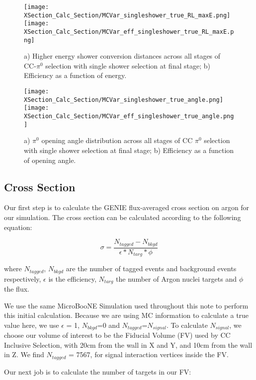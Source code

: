 \begin{figure}[h!]
\centering
\texttt{[image: XSection\_Calc\_Section/MCVar\_singleshower\_true\_RL\_maxE.png]}
\hspace{1 mm}
\texttt{[image: XSection\_Calc\_Section/MCVar\_eff\_singleshower\_true\_RL\_maxE.png]}
\caption{a) Higher energy shower conversion distances across all stages of CC-$\pi^0$ selection with single shower selection at final stage; b) Efficiency as a function of energy. }
\label{fig:pi0_effs_12}
\end{figure}


\begin{figure}[h!]
\texttt{[image: XSection\_Calc\_Section/MCVar\_singleshower\_true\_angle.png]}
\hspace{3 mm}
\texttt{[image: XSection\_Calc\_Section/MCVar\_eff\_singleshower\_true\_angle.png]}
\caption{a) $\pi^0$ opening angle distribution across all stages of CC $\pi^0$ selection with single shower selection at final stage; b) Efficiency as a function of opening angle. }
\label{fig:pi0_effs_13}
\end{figure}

\clearpage
\subsection{Cross Section}

Our first step is to calculate the GENIE flux-averaged cross section on argon for our simulation. The cross section can be calculated according to the following equation:

\begin{equation}
  \sigma = \frac{N_{tagged} - N_{bkgd}}{\epsilon*N_{targ}*\phi}
\end{equation}

\noindent where $N_{tagged}$, $N_{bkgd}$ are the number of tagged events and background events respectively, $\epsilon$ is the efficiency, $N_{targ}$ the number of Argon nuclei targets and $\phi$ the flux. 
\par We use the same MicroBooNE Simulation used throughout this note to perform this initial calculation.  Because we are using MC information to calculate a true value here, we use $\epsilon$ = 1, $N_{bkgd}$=0 and $N_{tagged}$=$N_{signal}$.  To calculate $N_{signal}$, we choose our volume of interest to be the Fiducial Volume (FV) used by CC Inclusive Selection, with 20cm from the wall in X and Y, and 10cm from the wall in Z. We find $N_{tagged}$ = 7567, for signal interaction vertices inside the FV. 
\par Our next job is to calculate the number of targets in our FV:

